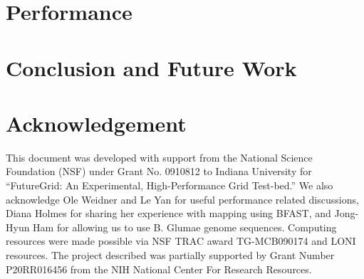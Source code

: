 \documentclass{sig-alternate}
\begin{document}
\section{Performance}


\section{Conclusion and Future Work}


%  



\section*{Acknowledgement}
This document was developed with support from the National Science
Foundation (NSF) under Grant No.  0910812 to Indiana University for
``FutureGrid: An Experimental, High-Performance Grid Test-bed.''  We
also acknowledge Ole Weidner and Le Yan for useful performance related
discussions, Diana Holmes for sharing her experience with mapping
using BFAST, and Jong-Hyun Ham for allowing us to use B. Glumae genome
sequences.  Computing resources were made possible via NSF TRAC award
TG-MCB090174 and LONI resources.  The project described was partially
supported by Grant Number P20RR016456 from the NIH National Center For
Research Resources.

 

\end{document}
